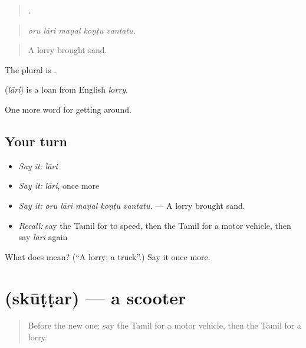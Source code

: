 \begin{quote}
    .
\end{quote}

\begin{quote}
\emph{oru lāri maṇal koṇṭu vantatu.}
\end{quote}

\begin{quote}
A lorry brought sand.
\end{quote}

The plural is .

\begin{cousinweb}
\textbf{} (\emph{lāri}) is a loan from English \emph{lorry}.
\end{cousinweb}

\begin{grammarlens}[title={What you've built}]
One more word for getting around.
\end{grammarlens}

\subsection*{Your turn}
\begin{itemize}
\raggedright
  \item \emph{Say it:} \emph{lāri}
  \item \emph{Say it:} \emph{lāri}, once more
  \item \emph{Say it:} \emph{oru lāri maṇal koṇṭu vantatu.} — A lorry brought sand.
  \item \emph{Recall:} say the Tamil for to speed, then the Tamil for a motor vehicle, then say \emph{lāri} again
\end{itemize}

\begin{tcolorbox}[breakable,colback=teal!4,colframe=teal!35!black,title={Before you move on}]
What does  mean? (\textquotedblleft{}A lorry; a truck\textquotedblright{}.) Say it once more.
\end{tcolorbox}
\section[\texorpdfstring{\ta{ஸ்கூட்டர்} (skūṭṭar)}{ஸ்கூட்டர் (skūṭṭar)}]{ (skūṭṭar) — a scooter}

\label{lesson:TA-C404-skuttar}



\begin{quote}
Before the new one: say the Tamil for a motor vehicle, then the Tamil for a lorry.
\end{quote}

